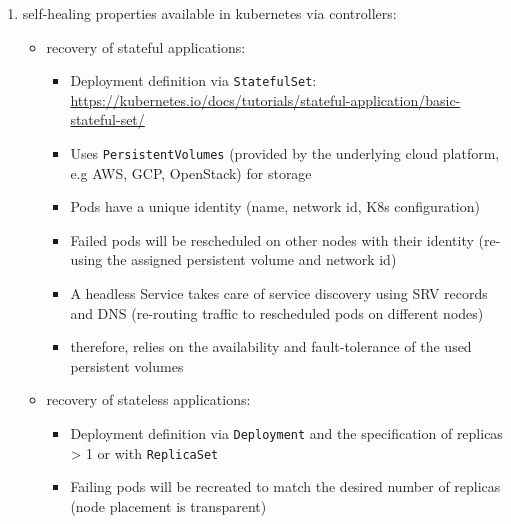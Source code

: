   \begin{enumerate}
    \item self-healing properties available in \gls{kubernetes} via controllers:
          \begin{itemize}
            \item recovery of stateful applications:
              \begin{itemize}
                \item Deployment definition via \texttt{StatefulSet}: \url{https://kubernetes.io/docs/tutorials/stateful-application/basic-stateful-set/}
                \item  Uses \texttt{PersistentVolumes} (provided by the underlying cloud platform, e.g AWS, GCP, OpenStack) for storage
                \item Pods have a unique identity (name, network id, K8s configuration)
                \item Failed pods will be rescheduled on other nodes with their identity (re-using the assigned persistent volume and network id)
                \item A headless Service takes care of service discovery using SRV records and DNS (re-routing traffic to rescheduled pods on different nodes)
                \item therefore, relies on the availability and fault-tolerance of the used persistent volumes
              \end{itemize}

            \item recovery of stateless applications:
              \begin{itemize}
                \item Deployment definition via \texttt{Deployment} and the specification of replicas > 1 or with \texttt{ReplicaSet}
                \item Failing pods will be recreated to match the desired number of replicas (node placement is transparent)
              \end{itemize}


\end{itemize}
\end{enumerate}
